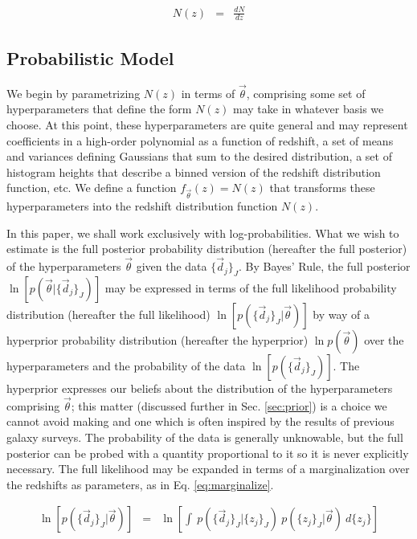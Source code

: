 \documentclass[preprint]{aastex}
\begin{document}
\begin{eqnarray}
\label{eq:distribution}
N(z) &=& \frac{dN}{dz}
\end{eqnarray}

\clearpage
\subsection{Probabilistic Model}
\label{sec:prob}

We begin by parametrizing $N(z)$ in terms of $\vec{\theta}$, comprising some 
set of hyperparameters that define the form $N(z)$ may take in whatever basis 
we choose.  At this point, these hyperparameters are quite general and may 
represent coefficients in a high-order polynomial as a function of redshift, a 
set of means and variances defining Gaussians that sum to the desired 
distribution, a set of histogram heights that describe a binned version of the 
redshift distribution function, etc.  We define a function 
$f_{\vec{\theta}}(z)=N(z)$ that transforms these hyperparameters into the 
redshift distribution function $N(z)$.

In this paper, we shall work exclusively with log-probabilities.  What we wish 
to estimate is the full posterior probability distribution (hereafter the full 
posterior) of the hyperparameters $\vec{\theta}$ given the data 
$\{\vec{d}_{j}\}_{J}$.  By Bayes' Rule, the full posterior 
$\ln[p(\vec{\theta}|\{\vec{d}_{j}\}_{J})]$ may be expressed in terms of the 
full likelihood probability distribution (hereafter the full likelihood) 
$\ln[p(\{\vec{d}_{j}\}_{J}|\vec{\theta})]$ by way of a hyperprior probability 
distribution (hereafter the hyperprior) $\ln p(\vec{\theta})$ over the 
hyperparameters and the probability of the data $\ln[p(\{\vec{d}_{j}\}_{J})]$.  
The hyperprior expresses our beliefs about the distribution of the 
hyperparameters comprising $\vec{\theta}$; this matter (discussed further in 
Sec. \ref{sec:prior}) is a choice we cannot avoid making and one which is often 
inspired by the results of previous galaxy surveys.  The probability of the 
data is generally unknowable, but the full posterior can be probed with a 
quantity proportional to it so it is never explicitly necessary.  The full 
likelihood may be expanded in terms of a marginalization over the redshifts as 
parameters, as in Eq. \ref{eq:marginalize}.  

\begin{eqnarray}
\label{eq:marginalize}
\ln[p(\{\vec{d}_{j}\}_{J}|\vec{\theta})] &=& \ln\left[\int\ 
p(\{\vec{d}_{j}\}_{J}|\{z_{j}\}_{J})\ p(\{z_{j}\}_{J}|\vec{\theta})\ 
d\{z_{j}\}\right]
\end{eqnarray}
\end{document}
